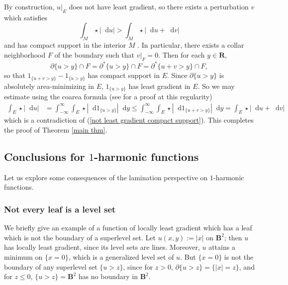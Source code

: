 \documentclass[reqno,11pt]{amsart}
\newcommand{\RR}{\mathbf{R}}
\newcommand{\Ball}{\mathbf{B}}
\newcommand*\dif{\mathop{}\!\mathrm{d}}
\theoremstyle{definition}
\numberwithin{equation}{section}
\begin{document}
By construction, $u|_E$ does not have least gradient, so there exists a perturbation $v$ which satisfies
\begin{equation}\label{not least gradient compact support}
\int_M \star |\dif u| > \int_M \star |\dif u + \dif v|
\end{equation}
and has compact support in the interior $M$ \cite[Theorem 2.2]{Sternberg93}.
In particular, there exists a collar neighborhood $F$ of the boundary such that $v|_F = 0$.
Then for each $y \in \RR$,
$$\partial \{u > y\} \cap F = \partial^* \{u > y\} \cap F = \partial^* \{u + v > y\} \cap F,$$
so that $1_{\{u + v > y\}} - 1_{\{u > y\}}$ has compact support in $E$.
Since $\partial \{u > y\}$ is absolutely area-minimizing in $E$, $1_{\{u > y\}}$ has least gradient in $E$.
So we may estimate using the coarea formula (see \cite[Proposition 2.5]{BackusFLG} for a proof at this regularity)
\begin{align*}
\int_E \star |\dif u| &= \int_{-\infty}^\infty \int_E \star |\dif 1_{\{u > y\}}| \dif y \leq \int_{-\infty}^\infty \int_E \star |\dif 1_{\{u + v > y\}}| \dif y = \int_E \star |\dif u + \dif v|
\end{align*}
which is a contradiction of (\ref{not least gradient compact support}).
This completes the proof of Theorem \ref{main thm}.


\subsection{Conclusions for \texorpdfstring{$1$-harmonic}{one-harmonic} functions}\label{1harmonic apps}
Let us explore some consequences of the lamination perspective on $1$-harmonic functions.

\subsubsection{Not every leaf is a level set}
We briefly give an example of a function of locally least gradient which has a leaf which is not the boundary of a superlevel set.
Let $u(x, y) := |x|$ on $\Ball^2$; then $u$ has locally least gradient, since its level sets are lines.
Moreover, $u$ attains a minimum on $\{x = 0\}$, which is a generalized level set of $u$.
But $\{x = 0\}$ is not the boundary of any superlevel set $\{u > z\}$, since for $z > 0$, $\partial \{u > z\} = \{|x| = z\}$, and for $z \leq 0$, $\{u > z\} = \Ball^2$ has no boundary in $\Ball^2$.

\end{document}
